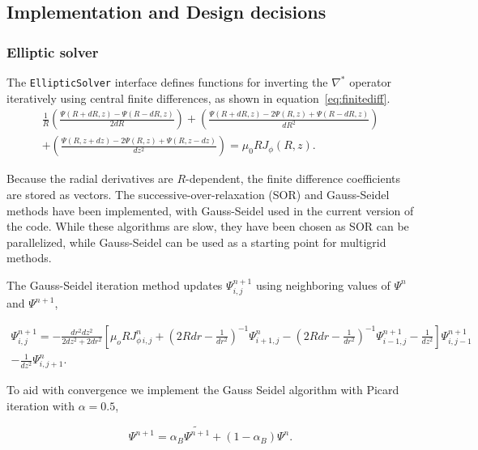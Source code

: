 \documentclass[paper=letter, fontsize=11pt]{scrartcl} %
\begin{document}
\restoregeometry

\subsection{Implementation and Design decisions}

\subsubsection{Elliptic solver}
The \texttt{EllipticSolver} interface defines functions for inverting the $\nabla^*$ operator iteratively using central finite differences, as shown in equation~\ref{eq:finitediff}.
\begin{multline} \label{eq:finitediff}
\frac{1}{R} \left(\frac{\Psi(R + dR, z) - \Psi(R - dR, z)}{2dR} \right) + \left( \frac{\Psi (R + dR, z) - 2\Psi(R,z) + \Psi(R-dR, z)}{dR^2} \right) \\ + \left(\frac{\Psi(R, z + dz) - 2\Psi(R,z)  + \Psi(R, z-dz)}{dz^2}\right) = \mu_0 R J_{\phi}(R,z). 
\end{multline}

Because the radial derivatives are $R$-dependent, the finite difference coefficients are stored as vectors. The successive-over-relaxation (SOR) and Gauss-Seidel methods have been implemented, with Gauss-Seidel used in the current version of the code. While these algorithms are slow, they have been chosen as SOR can be parallelized, while Gauss-Seidel can be used as a starting point for multigrid methods. 

The Gauss-Seidel iteration method updates $\Psi^{n+1}_{i,j}$ using neighboring values of $\Psi^{n}$ and $\Psi^{n+1}$, 

\begin{multline} \label{eq:gaussseidel}
\Psi^{n+1}_{i,j} = -\frac{dr^2 dz^2}{2dz^2 + 2dr^2} \left[ \mu_o R J^n_{\phi \, i, j} + \left(2 R dr - \frac{1}{dr^2}\right)^{-1} \Psi^{n}_{i+1,j} - \left(2 R dr - \frac{1}{dr^2}\right)^{-1} \Psi^{n+1}_{i-1,j} - \frac{1}{dz^2} \right] \Psi^{n+1}_{i,j-1} \\ - \frac{1}{dz^2}\Psi^n_{i, j+1}. 
\end{multline}

To aid with convergence we implement the Gauss Seidel algorithm with Picard iteration with $\alpha = 0.5$, 

\begin{equation} \label{eq:picard}
\Psi^{n+1} = \alpha_B \widetilde{\Psi^{n+1}} + (1 - \alpha_{B}) \Psi^n. 
\end{equation}
\end{document}
